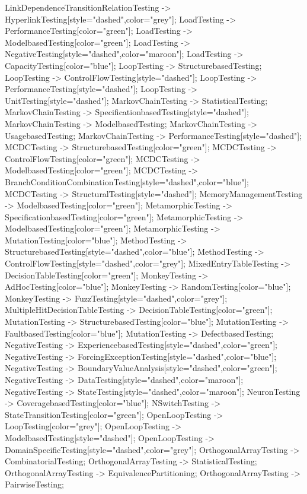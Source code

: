 \documentclass{article}
\begin{document}
{LinkDependenceTransitionRelationTesting -> HyperlinkTesting[style="dashed",color="grey"];
LoadTesting -> PerformanceTesting[color="green"];
LoadTesting -> ModelbasedTesting[color="green"];
LoadTesting -> NegativeTesting[style="dashed",color="maroon"];
LoadTesting -> CapacityTesting[color="blue"];
LoopTesting -> StructurebasedTesting;
LoopTesting -> ControlFlowTesting[style="dashed"];
LoopTesting -> PerformanceTesting[style="dashed"];
LoopTesting -> UnitTesting[style="dashed"];
MarkovChainTesting -> StatisticalTesting;
MarkovChainTesting -> SpecificationbasedTesting[style="dashed"];
MarkovChainTesting -> ModelbasedTesting;
MarkovChainTesting -> UsagebasedTesting;
MarkovChainTesting -> PerformanceTesting[style="dashed"];
MCDCTesting -> StructurebasedTesting[color="green"];
MCDCTesting -> ControlFlowTesting[color="green"];
MCDCTesting -> ModelbasedTesting[color="green"];
MCDCTesting -> BranchConditionCombinationTesting[style="dashed",color="blue"];
MCDCTesting -> StructuralTesting[style="dashed"];
MemoryManagementTesting -> ModelbasedTesting[color="green"];
MetamorphicTesting -> SpecificationbasedTesting[color="green"];
MetamorphicTesting -> ModelbasedTesting[color="green"];
MetamorphicTesting -> MutationTesting[color="blue"];
MethodTesting -> StructurebasedTesting[style="dashed",color="blue"];
MethodTesting -> ControlFlowTesting[style="dashed",color="grey"];
MixedEntryTableTesting -> DecisionTableTesting[color="green"];
MonkeyTesting -> AdHocTesting[color="blue"];
MonkeyTesting -> RandomTesting[color="blue"];
MonkeyTesting -> FuzzTesting[style="dashed",color="grey"];
MultipleHitDecisionTableTesting -> DecisionTableTesting[color="green"];
MutationTesting -> StructurebasedTesting[color="blue"];
MutationTesting -> FaultbasedTesting[color="blue"];
MutationTesting -> DefectbasedTesting;
NegativeTesting -> ExperiencebasedTesting[style="dashed",color="green"];
NegativeTesting -> ForcingExceptionTesting[style="dashed",color="blue"];
NegativeTesting -> BoundaryValueAnalysis[style="dashed",color="green"];
NegativeTesting -> DataTesting[style="dashed",color="maroon"];
NegativeTesting -> StateTesting[style="dashed",color="maroon"];
NeuronTesting -> CoveragebasedTesting[color="blue"];
NSwitchTesting -> StateTransitionTesting[color="green"];
OpenLoopTesting -> LoopTesting[color="grey"];
OpenLoopTesting -> ModelbasedTesting[style="dashed"];
OpenLoopTesting -> DomainSpecificTesting[style="dashed",color="grey"];
OrthogonalArrayTesting -> CombinatorialTesting;
OrthogonalArrayTesting -> StatisticalTesting;
OrthogonalArrayTesting -> EquivalencePartitioning;
OrthogonalArrayTesting -> PairwiseTesting;
}
\end{document}
